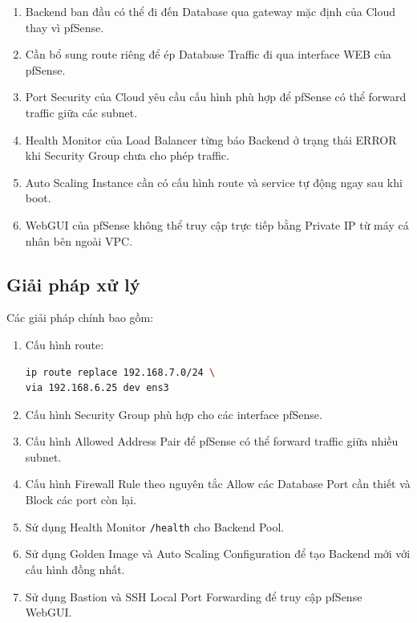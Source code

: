 \documentclass[12pt, a4paper]{article}
\begin{document}
\begin{enumerate}
    \item Backend ban đầu có thể đi đến Database qua gateway mặc định
    của Cloud thay vì pfSense.

    \item Cần bổ sung route riêng để ép Database Traffic đi qua
    interface WEB của pfSense.

    \item Port Security của Cloud yêu cầu cấu hình phù hợp
    để pfSense có thể forward traffic giữa các subnet.

    \item Health Monitor của Load Balancer từng báo Backend
    ở trạng thái ERROR khi Security Group chưa cho phép traffic.

    \item Auto Scaling Instance cần có cấu hình route và service
    tự động ngay sau khi boot.

    \item WebGUI của pfSense không thể truy cập trực tiếp bằng Private IP
    từ máy cá nhân bên ngoài VPC.
\end{enumerate}

\subsection{Giải pháp xử lý}

Các giải pháp chính bao gồm:

\begin{enumerate}
    \item Cấu hình route:

\begin{lstlisting}[language=bash]
ip route replace 192.168.7.0/24 \
via 192.168.6.25 dev ens3
\end{lstlisting}

    \item Cấu hình Security Group phù hợp cho các interface pfSense.

    \item Cấu hình Allowed Address Pair để pfSense có thể
    forward traffic giữa nhiều subnet.

    \item Cấu hình Firewall Rule theo nguyên tắc
    Allow các Database Port cần thiết và Block các port còn lại.

    \item Sử dụng Health Monitor \texttt{/health}
    cho Backend Pool.

    \item Sử dụng Golden Image và Auto Scaling Configuration
    để tạo Backend mới với cấu hình đồng nhất.

    \item Sử dụng Bastion và SSH Local Port Forwarding
    để truy cập pfSense WebGUI.
\end{enumerate}
\end{document}
